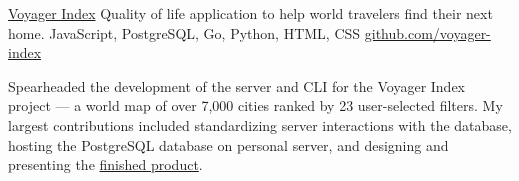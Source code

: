 \showoff
{\textcolor{my-blue}{\href{https://voyager-index.herokuapp.com}{Voyager Index}}}
{Quality of life application to help world travelers find their next home.}
{JavaScript, PostgreSQL, Go, Python, HTML, CSS}
{\textcolor{my-blue}{\href{https://github.com/voyager-index/}{github.com/voyager-index}}}

Spearheaded the development of the server and CLI for the Voyager Index project — a world map of over 7,000 cities ranked by 23 user-selected filters. My largest contributions included standardizing server interactions with the database, hosting the PostgreSQL database on personal server, and designing and presenting the \textcolor{my-blue}{\href{https://liambeckman.com/pkgs/posters/voyager-index.pdf}{finished product}}.

